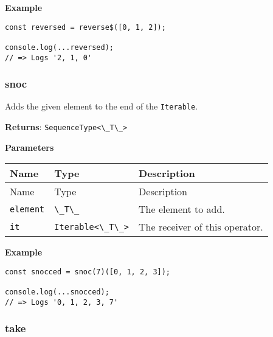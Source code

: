 \textbf{Example}

\begin{lstlisting}[label=166e8d11-881b-4158-8801-cc8314501b92]
const reversed = reverse$([0, 1, 2]);
                                   
console.log(...reversed);
// => Logs '2, 1, 0'
\end{lstlisting}

\hypertarget{2a8b7db1-3dc9-494e-9b73-5921e8508471}{%
\subsubsection{snoc}\label{2a8b7db1-3dc9-494e-9b73-5921e8508471}}

Adds the given element to the end of the
\passthrough{\lstinline!Iterable!}.

\textbf{Returns}: \passthrough{\lstinline!SequenceType<\_T\_>!}

\textbf{Parameters}

\begin{longtable}[]{
  >{\raggedright\arraybackslash}p{}
  >{\raggedright\arraybackslash}p{}
  >{\raggedright\arraybackslash}p{}@{}}

\toprule\noalign{}
Name & Type & Description \\
\midrule\noalign{}
\endfirsthead
\toprule\noalign{}
Name & Type & Description \\
\midrule\noalign{}
\endhead
\bottomrule\noalign{}
\endlastfoot
\passthrough{\lstinline!element!} & \passthrough{\lstinline!\_T\_!} &
The element to add. \\
\passthrough{\lstinline!it!} & \passthrough{\lstinline!Iterable<\_T\_>!}
& The receiver of this operator. \\
\end{longtable}

\textbf{Example}

\begin{lstlisting}[label=eca2c8ba-39bb-4044-81c8-996f42643934]
const snocced = snoc(7)([0, 1, 2, 3]);
                                      
console.log(...snocced);
// => Logs '0, 1, 2, 3, 7'
\end{lstlisting}

\hypertarget{78987131-f1a4-443e-89de-8a3d68ccbdbf}{%
\subsubsection{take}\label{78987131-f1a4-443e-89de-8a3d68ccbdbf}}

